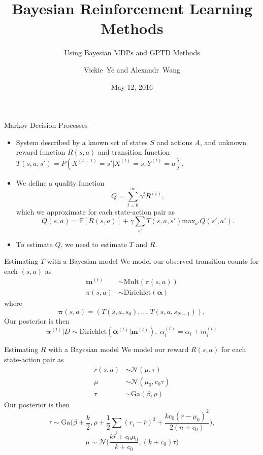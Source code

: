 \documentclass{beamer}
\title { Bayesian Reinforcement Learning Methods }
\subtitle { Using Bayesian MDPs and GPTD Methods }
\author[Vickie Ye and Alexandr Wang]
{ Vickie~Ye and Alexandr~Wang}
\date[Spring 2016]
{ May 12, 2016}
\begin{document}
\begin{frame}
\titlepage
\end{frame}

\begin{frame}{Markov Decision Processes}

\begin{itemize}
\item System described by a known set of states $S$ and actions $A$,
and unknown reward function $R(s, a)$ and transition function
$T(s, a, s') = P(X^{(t+1)} = s' | X^{(t)} = s, Y^{(t)} = a)$.
\item We define a quality function
$$Q = \sum_{t=0}^\infty \gamma^t R^{(t)},$$
which we approximate for each state-action pair as
$$Q(s, a) = \mathbb{E}[R(s,a)]+\gamma\sum_{s'}T(s, a, s')
\textrm{max}_{a'} Q(s',a').$$
\item To estimate $Q$, we need to estimate $T$ and $R$.
\end{itemize}
\end{frame}

\begin{frame}{Estimating $T$ with a Bayesian model}
We model our observed transition counts for each $(s, a)$ as
\begin{align*}
\mathbf{m}^{(t)} &\sim \textrm{Mult}(\pi(s, a))\\
\pi(s, a) &\sim \textrm{Dirichlet}(\mathbf{\alpha})
\end{align*}
where 
\begin{equation*}
\mathbf{\pi}(s, a) = (T(s, a, s_0), ..., T(s, a, s_{N-1})),
\end{equation*}
Our posterior is then 
\begin{equation*}
\mathbf{\pi}^{(t)}| D \sim \textrm{Dirichlet}(\mathbf{\alpha}^{(t)}|
\mathbf{m}^{(t)}), \;
\alpha^{(t)}_i = \alpha_i + m_i^{(t)}
\end{equation*}
\end{frame}

\begin{frame}{Estimating $R$ with a Bayesian model}
We model our reward $R(s, a)$ for each state-action pair as
\begin{align*}
r(s, a) &\sim \mathcal{N}(\mu, \tau) \\
\mu &\sim \mathcal{N}(\mu_0, c_0\tau) \\
\tau &\sim \textrm{Ga}(\beta, \rho)
\end{align*}
Our posterior is then
$$\tau \sim \textrm{Ga}\Big(\beta + \frac{k}{2}, \rho + \frac{1}{2}\sum_i(r_i - \bar{r})^2
+ \frac{kc_0(\bar{r}-\mu_0)^2}{2(n+c_0)}\Big),$$
$$\mu \sim \mathcal{N}\Big(\frac{k\bar{r} + c_0\mu_0}{k + c_0}, (k+c_0)\tau\Big)$$
\end{frame}
\end{document}
